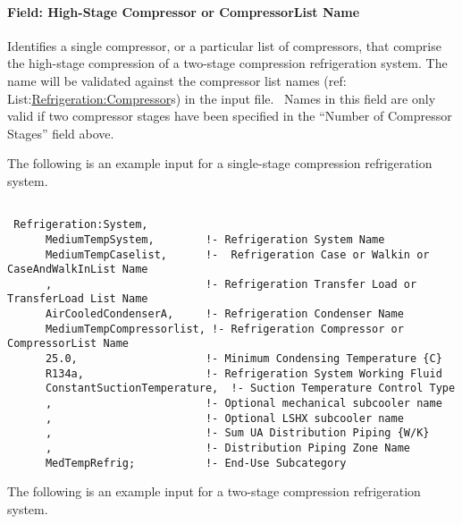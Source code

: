 \paragraph{Field: High-Stage Compressor or CompressorList Name}\label{field-high-stage-compressor-or-compressorlist-name}

Identifies a single compressor, or a particular list of compressors, that comprise the high-stage compression of a two-stage compression refrigeration system. The name will be validated against the compressor list names (ref: List:\hyperref[refrigerationcompressor]{Refrigeration:Compressor}s) in the input file.~ Names in this field are only valid if two compressor stages have been specified in the ``Number of Compressor Stages'' field above.

The following is an example input for a single-stage compression refrigeration system.

\begin{lstlisting}

 Refrigeration:System,
      MediumTempSystem,        !- Refrigeration System Name
      MediumTempCaselist,      !-  Refrigeration Case or Walkin or CaseAndWalkInList Name
      ,                        !- Refrigeration Transfer Load or TransferLoad List Name
      AirCooledCondenserA,     !- Refrigeration Condenser Name
      MediumTempCompressorlist, !- Refrigeration Compressor or CompressorList Name
      25.0,                    !- Minimum Condensing Temperature {C}
      R134a,                   !- Refrigeration System Working Fluid
      ConstantSuctionTemperature,  !- Suction Temperature Control Type
      ,                        !- Optional mechanical subcooler name
      ,                        !- Optional LSHX subcooler name
      ,                        !- Sum UA Distribution Piping {W/K}
      ,                        !- Distribution Piping Zone Name
      MedTempRefrig;           !- End-Use Subcategory
\end{lstlisting}

The following is an example input for a two-stage compression refrigeration system.

